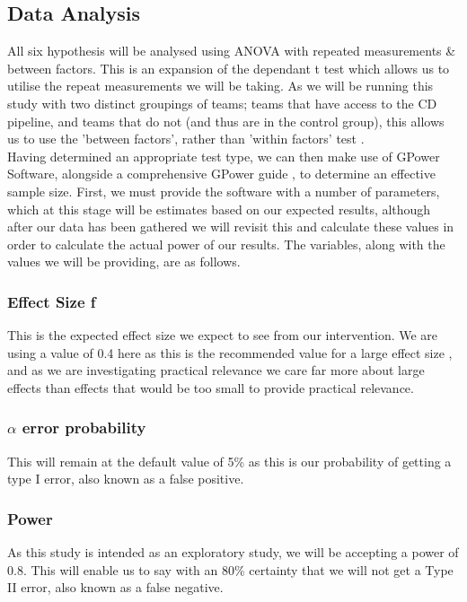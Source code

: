 \documentclass[lettersize,journal]{IEEEtran}
\begin{document}
    \subsection{Data Analysis}
        All six hypothesis will be analysed using ANOVA with repeated measurements \& between factors. This is an expansion of the dependant t test \cite{carvadiaANOVA} which allows us to utilise the repeat measurements we will be taking. As we will be running this study with two distinct groupings of teams; teams that have access to the CD pipeline, and teams that do not (and thus are in the control group), this allows us to use the 'between factors', rather than 'within factors' test \cite{carvadiaANOVA}. \\
        Having determined an appropriate test type, we can then make use of GPower Software\cite{faul2007g,faul2009statistical}, alongside a comprehensive GPower guide \cite{gpowerguide}, to determine an effective sample size. First, we must provide the software with a number of parameters, which at this stage will be estimates based on our expected results, although after our data has been gathered we will revisit this and calculate these values in order to calculate the actual power of our results. The variables, along with the values we will be providing, are as follows.\\

        \subsubsection*{Effect Size f}
            This is the expected effect size we expect to see from our intervention. We are using a value of 0.4 here as this is the recommended value for a large effect size \cite{cohen1992power}, and as we are investigating practical relevance we care far more about large effects than effects that would be too small to provide practical relevance.\\

        \subsubsection*{$\alpha$ error probability}
            This will remain at the default value of 5\% as this is our probability of getting a type I error, also known as a false positive\cite{errortype}.\\

        \subsubsection*{Power}
            As this study is intended as an exploratory study, we will be accepting a power of 0.8. This will enable us to say with an 80\% certainty that we will not get a Type II error, also known as a false negative\cite{errortype}.\\
\end{document}

